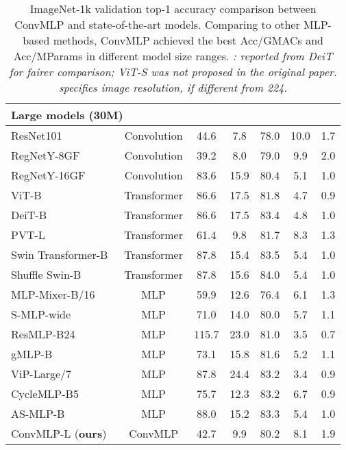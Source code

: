 \documentclass[final]{cvpr}
\begin{document}
\begin{table*}[!ht]
{\begin{tabular}{l|cccc|cc}
\multicolumn{3}{l}{\textbf{{Large models (30M)}}} \\
\midrule
ResNet101~\cite{he2016deep} & Convolution & 44.6 & 7.8 & 78.0 & 10.0 & 1.7 \\
RegNetY-8GF~\cite{radosavovic2020designing} & Convolution & 39.2 & 8.0 & 79.0 & 9.9 & 2.0 \\
RegNetY-16GF~\cite{radosavovic2020designing} & Convolution & 83.6 & 15.9 & 80.4 & 5.1 & 1.0 \\
\midrule
ViT-B~\cite{dosovitskiy2020image}  & Transformer & 86.6 & 17.5 & 81.8 & 4.7 & 0.9 \\
DeiT-B~\cite{touvron2021training} & Transformer & 86.6 & 17.5 & 83.4 & 4.8 & 1.0 \\
PVT-L~\cite{wang2021pyramid} & Transformer & 61.4 & 9.8 & 81.7 & 8.3 & 1.3 \\
Swin Transformer-B~\cite{liu2021swin} & Transformer & 87.8 & 15.4 & 83.5 & 5.4 & 1.0 \\
Shuffle Swin-B~\cite{huang2021shuffle} & Transformer & 87.8 & 15.6 & 84.0 & 5.4 & 1.0 \\
\midrule
MLP-Mixer-B/16~\cite{tolstikhin2021mlp} & MLP & 59.9 & 12.6 & 76.4 & 6.1 & 1.3 \\
S-MLP-wide~\cite{yu2021s} & MLP & 71.0 & 14.0 & 80.0 & 5.7 & 1.1 \\
ResMLP-B24~\cite{touvron2021resmlp} & MLP & 115.7 & 23.0 & 81.0 & 3.5 & 0.7 \\
gMLP-B~\cite{liu2021pay} & MLP & 73.1 & 15.8 & 81.6 & 5.2 & 1.1 \\
ViP-Large/7~\cite{hou2021vision} & MLP & 87.8 & 24.4 & 83.2 & 3.4 & 0.9 \\
CycleMLP-B5~\cite{chen2021cyclemlp} & MLP & 75.7 & 12.3 & 83.2 & 6.7 & 0.9 \\
AS-MLP-B~\cite{lian2021mlp} & MLP & 88.0 & 15.2 & 83.3 & 5.4 & 1.0 \\
\midrule
ConvMLP-L (\textbf{ours}) & ConvMLP & 42.7 & 9.9 & 80.2 & 8.1 & 1.9 \\
\bottomrule[2pt]
\end{tabular}}
\caption{ImageNet-1k validation top-1 accuracy comparison between ConvMLP and state-of-the-art models. 
Comparing to other MLP-based methods, ConvMLP achieved the best Acc/GMACs and Acc/MParams in different model size ranges.
\textit{\small : reported from DeiT for fairer comparison; ViT-S was not proposed in the original paper.  specifies image resolution, if different from 224.}}
\label{tab:imagenetclassif}
\end{table*} \begin{table*}[!ht]

\end{table*}
\end{document}
